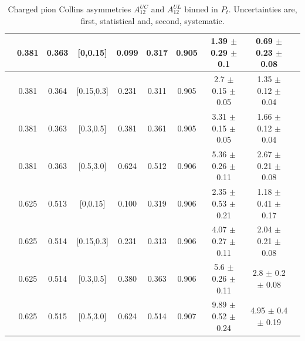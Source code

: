 \documentclass[aps,prX,preprint,groupedaddress,linenumbers]{revtex4-1}
\begin{document}
\begin{table}[H]
\begin{tabular}{|c| c| c| c| c| c| c| c| c| c|}
\hline
[0.3,0.5]	&	0.381	&	0.363	&	[0,0.15]	&	0.099	&	0.317	&	0.905	&1.39  $\pm$ 0.29  $\pm$ 0.1   & 0.69  $\pm$ 0.23  $\pm$ 0.08 \\ \hline
[0.3,0.5]	&	0.381	&	0.364	&	[0.15,0.3]	&	0.231	&	0.311	&	0.905	&2.7  $\pm$ 0.15  $\pm$ 0.05   & 1.35  $\pm$ 0.12  $\pm$ 0.04 \\ \hline
[0.3,0.5]	&	0.381	&	0.363	&	[0.3,0.5]	&	0.381	&	0.361	&	0.905	&3.31  $\pm$ 0.15  $\pm$ 0.05  & 1.66  $\pm$ 0.12  $\pm$ 0.04 \\ \hline
[0.3,0.5]	&	0.381	&	0.363	&	[0.5,3.0]	&	0.624	&	0.512	&	0.906	&5.36  $\pm$ 0.26  $\pm$ 0.11  & 2.67  $\pm$ 0.21  $\pm$ 0.08 \\ \hline
\hline
[0.5,3.0]	&	0.625	&	0.513	&	[0,0.15]	&	0.100	&	0.319	&	0.906	&2.35  $\pm$ 0.53  $\pm$ 0.21  & 1.18  $\pm$ 0.41  $\pm$ 0.17 \\ \hline
[0.5,3.0]	&	0.625	&	0.514	&	[0.15,0.3]	&	0.231	&	0.313	&	0.906	&4.07  $\pm$ 0.27  $\pm$ 0.11  & 2.04  $\pm$ 0.21  $\pm$ 0.08 \\ \hline
[0.5,3.0]	&	0.625	&	0.514	&	[0.3,0.5]	&	0.380	&	0.363	&	0.906	&5.6  $\pm$ 0.26  $\pm$ 0.11   & 2.8  $\pm$ 0.2  $\pm$ 0.08   \\ \hline
[0.5,3.0]	&	0.625	&	0.515	&	[0.5,3.0]	&	0.624	&	0.514	&	0.907	&9.89  $\pm$ 0.52  $\pm$ 0.24  & 4.95  $\pm$ 0.4  $\pm$ 0.19  \\ \hline
\end{tabular}
\caption[Charged pion Collins asymmetries $A_{12}^{UC}$ and $A_{12}^{UL}$ binned in $P_t$]{Charged pion Collins asymmetries $A_{12}^{UC}$ and $A_{12}^{UL}$ binned in $P_t$. Uncertainties are, first, statistical and, second, systematic.}
\label{tab:finalulucptbins}
\end{table}
\end{document}
